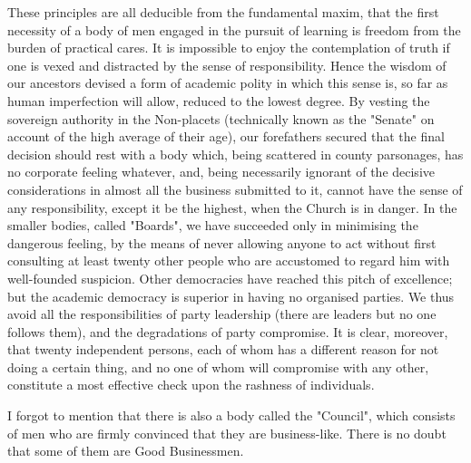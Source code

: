 \documentclass[12pt, oneside, b5paper]{memoir}
\begin{document}
These principles are all deducible from the fundamental maxim, that the first necessity of a body of men engaged in the pursuit of learning is freedom from the burden of practical cares. It is impossible to enjoy the contemplation of truth if one is vexed and distracted by the sense of responsibility. Hence the wisdom of our ancestors devised a form of academic polity in which this sense is, so far as human imperfection will allow, reduced to the lowest degree. By vesting the sovereign authority in the Non-placets (technically known as the "Senate" on account of the high average of their age), our forefathers secured that the final decision should rest with a body which, being scattered in county parsonages, has no corporate feeling whatever, and, being necessarily ignorant of the decisive considerations in almost all the business submitted to it, cannot have the sense of any responsibility, except it be the highest, when the Church is in danger. In the smaller bodies, called "Boards", we have succeeded only in minimising the dangerous feeling, by the means of never allowing anyone to act without first consulting at least twenty other people who are accustomed to regard him with well-founded suspicion. Other democracies have reached this pitch of excellence; but the academic democracy is superior in having no organised parties. We thus avoid all the responsibilities of party leadership (there are leaders but no one follows them), and the degradations of party compromise. It is clear, moreover, that twenty independent persons, each of whom has a different reason for not doing a certain thing, and no one of whom will compromise with any other, constitute a most effective check upon the rashness of individuals.

I forgot to mention that there is also a body called the "Council", which consists of men who are firmly convinced that they are business-like. There is no doubt that some of them are Good Businessmen.
\end{document}
